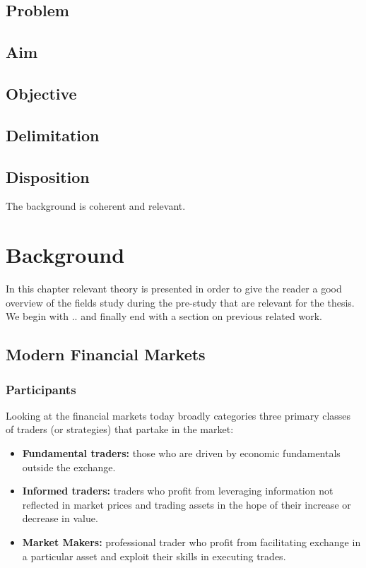 \documentclass{kththesis}
\theoremstyle{definition}
\begin{document}
 



\section{Problem}

\section{Aim}

\section{Objective}

\section{Delimitation}

\section{Disposition}


The background is coherent and relevant.
\chapter{Background}
In this chapter relevant theory is presented in order to give the reader a good overview of the fields study during the pre-study that are relevant for the thesis. We begin with .. and finally end with a section on previous related work.

\section{Modern Financial Markets}

\subsection{Participants}
Looking at the financial markets today \textcite{cartea2015algorithmic} broadly categories three primary classes of traders (or strategies) that partake in the market:
\begin{itemize}
    \item \textbf{Fundamental traders:} those who are driven by economic fundamentals outside the exchange.
    \item \textbf{Informed traders:} traders who profit from leveraging information not reflected in market prices and trading assets in the hope of their increase or decrease in value.
    \item \textbf{Market Makers:} professional trader who profit from facilitating exchange in a particular asset and exploit their skills in executing trades.
\end{itemize}
\end{document}
